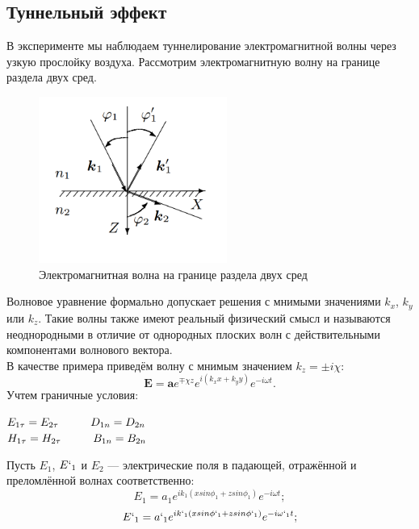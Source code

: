 \documentclass[12pt]{article}
\begin{document}
\subsection{Туннельный эффект}
В эксперименте мы наблюдаем туннелирование электромагнитной волны через узкую прослойку воздуха. Рассмотрим электромагнитную волну на границе раздела двух сред.\\
\begin{figure}
\includegraphics[width=0.55\textwidth]{teorborder}
\caption{Электромагнитная волна на границе раздела двух сред}
\end{figure}
Волновое уравнение формально допускает решения с мнимыми значениями $k_x$, $k_y$ или $k_z$. Такие волны также имеют реальный физический смысл и называются неоднородными в отличие от однородных плоских волн с действительными компонентами волнового вектора.\\
В качестве примера приведём волну с мнимым значением $k_z = \pm i \chi$:\\
\begin{equation}
\textbf{E} = \textbf{a}e^{\mp \chi z}e^{i(k_x x + k_y y)}e^{-i\omega t}. 
\end{equation}
Учтем граничные условия:
\begin{center}
$E_{1\tau} = E_{2\tau} \hspace{1 cm} D_{1n} = D_{2n}$ \\ 
$H_{1\tau} = H_{2\tau} \hspace{1 cm} B_{1n} = B_{2n}$  \\
\end{center}
Пусть $E_1$, $E`_1$ и $E_2$ — электрические поля в падающей, отражённой и преломлённой волнах соответственно:
\begin{equation}
E_1 = a_1 e^{ik_1(x sin{\phi_1} + z sin{\phi_1})}e^{-i\omega t};
\end{equation}
\begin{equation}
E`_1 = a`_1 e^{ik`_1(x sin{\phi`_1} + z sin{\phi`_1})}e^{-i\omega`_1 t};
\end{equation}
\end{document}
